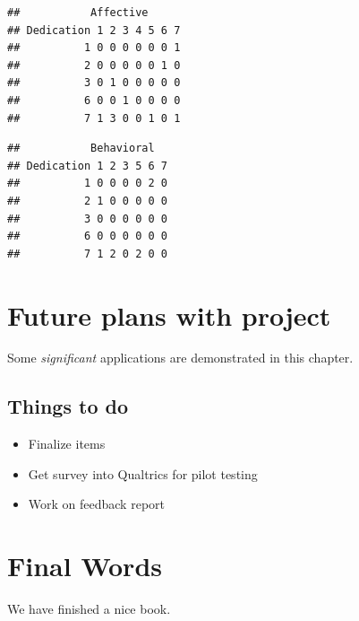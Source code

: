 \documentclass[
]{book}
\providecommand{\tightlist}{%
  \setlength{\itemsep}{0pt}\setlength{\parskip}{0pt}}
\begin{document}
\begin{verbatim}
##           Affective
## Dedication 1 2 3 4 5 6 7
##          1 0 0 0 0 0 0 1
##          2 0 0 0 0 0 1 0
##          3 0 1 0 0 0 0 0
##          6 0 0 1 0 0 0 0
##          7 1 3 0 0 1 0 1
\end{verbatim}

\begin{verbatim}
##           Behavioral
## Dedication 1 2 3 5 6 7
##          1 0 0 0 0 2 0
##          2 1 0 0 0 0 0
##          3 0 0 0 0 0 0
##          6 0 0 0 0 0 0
##          7 1 2 0 2 0 0
\end{verbatim}

\hypertarget{future-plans-with-project}{%
\chapter{Future plans with project}\label{future-plans-with-project}}

Some \emph{significant} applications are demonstrated in this chapter.

\hypertarget{things-to-do}{%
\section{Things to do}\label{things-to-do}}

\begin{itemize}
\tightlist
\item
  Finalize items
\item
  Get survey into Qualtrics for pilot testing
\item
  Work on feedback report
\end{itemize}

\hypertarget{final-words}{%
\chapter{Final Words}\label{final-words}}

We have finished a nice book.

  
\end{document}
